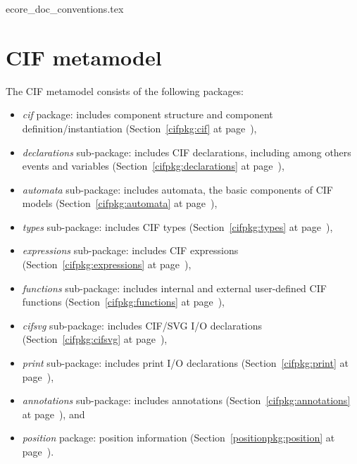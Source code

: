 \documentclass{report}
\begin{document}

       {ecore_doc_conventions.tex}


\chapter{CIF metamodel}\label{ch:cif}

The CIF metamodel consists of the following packages:
\begin{itemize}
    \item \emph{cif} package: includes component structure and component
        definition/instantiation (Section~\ref{cifpkg:cif} at
        page~\pageref{cifpkg:cif}),
    \item \emph{declarations} sub-package: includes CIF declarations,
        including among others events and variables
        (Section~\ref{cifpkg:declarations} at
        page~\pageref{cifpkg:declarations}),
    \item \emph{automata} sub-package: includes automata, the basic components
        of CIF models (Section~\ref{cifpkg:automata} at
        page~\pageref{cifpkg:automata}),
    \item \emph{types} sub-package: includes CIF types
        (Section~\ref{cifpkg:types} at page~\pageref{cifpkg:types}),
    \item \emph{expressions} sub-package: includes CIF expressions
        (Section~\ref{cifpkg:expressions} at
        page~\pageref{cifpkg:expressions}),
    \item \emph{functions} sub-package: includes internal and external
        user-defined CIF functions (Section~\ref{cifpkg:functions} at
        page~\pageref{cifpkg:functions}),
    \item \emph{cifsvg} sub-package: includes CIF/SVG I/O declarations
        (Section~\ref{cifpkg:cifsvg} at page~\pageref{cifpkg:cifsvg}),
    \item \emph{print} sub-package: includes print I/O declarations
        (Section~\ref{cifpkg:print} at page~\pageref{cifpkg:print}),
    \item \emph{annotations} sub-package: includes annotations
        (Section~\ref{cifpkg:annotations} at page~\pageref{cifpkg:annotations}),
        and
    \item \emph{position} package: position information
        (Section~\ref{positionpkg:position} at
        page~\pageref{positionpkg:position}).
\end{itemize}
\end{document}

